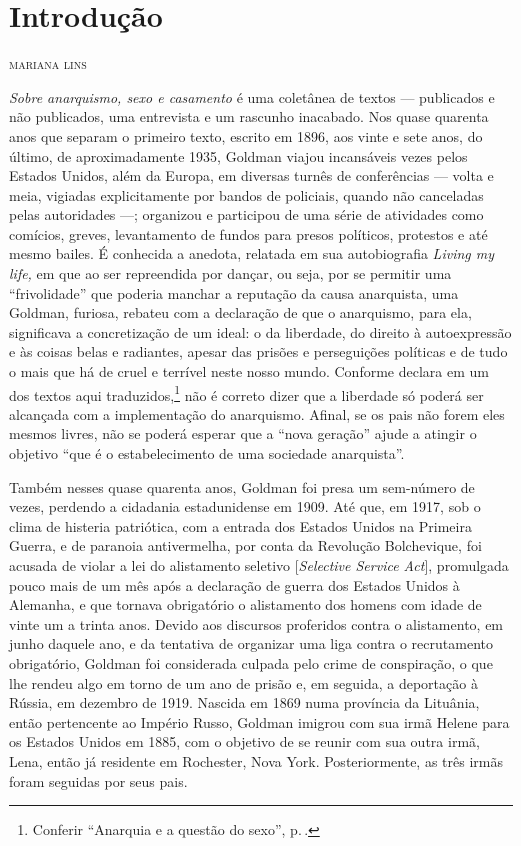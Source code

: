 \pagestyle{plain}

\chapter{Introdução}

\begin{flushright}
\textsc{mariana lins}
\end{flushright}\bigskip

\noindent\emph{Sobre anarquismo, sexo e casamento} é uma coletânea de
textos --- publicados e não publicados, uma entrevista e um rascunho
inacabado. Nos quase quarenta anos que separam o primeiro texto, escrito em 1896, aos vinte e sete anos, do último, de
aproximadamente 1935, Goldman viajou incansáveis vezes pelos Estados
Unidos, além da Europa, em diversas turnês de conferências --- volta e
meia, vigiadas explicitamente por bandos de policiais, quando não
canceladas pelas autoridades ---; organizou e participou de uma série de
atividades como comícios, greves, levantamento de fundos para presos
políticos, protestos e até mesmo bailes. É conhecida a anedota, relatada
em sua autobiografia \emph{Living my life,} em que ao ser repreendida
por dançar, ou seja, por se permitir uma ``frivolidade'' que poderia
manchar a reputação da causa anarquista, uma Goldman, furiosa, rebateu
com a declaração de que o anarquismo, para ela, significava a
concretização de um ideal: o da liberdade, do direito à
autoexpressão e às coisas belas e radiantes, apesar das prisões e
perseguições políticas e de tudo o mais que há de cruel e terrível neste
nosso mundo. Conforme declara em um dos textos aqui traduzidos,\footnote{Conferir ``Anarquia e a questão do sexo'', p.\,\pageref{ref1}.}
não é correto dizer que a
liberdade só poderá ser alcançada com a implementação do anarquismo.
Afinal, se os pais não forem eles mesmos livres, não se poderá esperar
que a ``nova geração'' ajude a atingir o objetivo ``que é o
estabelecimento de uma sociedade anarquista''.

Também nesses quase quarenta anos, Goldman foi presa um sem-número de
vezes, perdendo a cidadania estadunidense em 1909. Até que, em 1917, sob
o clima de histeria patriótica, com a entrada dos Estados Unidos na
Primeira Guerra, e de paranoia antivermelha, por conta da Revolução
Bolchevique, foi acusada de violar a lei do alistamento seletivo
{[}\emph{Selective Service Act}{]}, promulgada pouco mais de um mês após
a declaração de guerra dos Estados Unidos à Alemanha, e que tornava
obrigatório o alistamento dos homens com idade de vinte um a trinta
anos. Devido aos discursos proferidos contra o alistamento, em junho
daquele ano, e da tentativa de organizar uma liga contra o recrutamento
obrigatório, Goldman foi considerada culpada pelo crime de conspiração,
o que lhe rendeu algo em torno de um ano de prisão e, em seguida, a
deportação à Rússia, em dezembro de 1919. Nascida em 1869 numa província da
Lituânia, então pertencente ao Império Russo, Goldman imigrou
com sua irmã Helene para os Estados Unidos em 1885, com o objetivo de
se reunir com sua outra irmã, Lena, então já residente em Rochester,
Nova York. Posteriormente, as três irmãs foram seguidas por seus pais.

